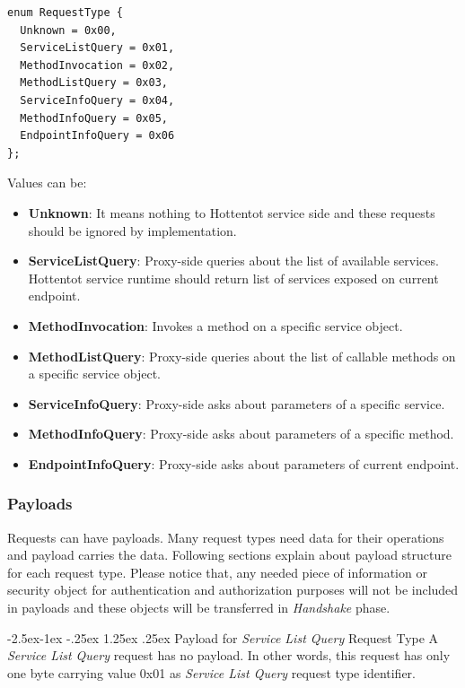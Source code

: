\documentclass[10pt,a4paper]{article}
\makeatletter
\renewcommand\paragraph{\@startsection{paragraph}{4}{\z@}%
            {-2.5ex\@plus -1ex \@minus -.25ex}%
            {1.25ex \@plus .25ex}%
            {\normalfont\normalsize\bfseries}}
\makeatother
\begin{document}
\begin{verbatim}
enum RequestType { 
  Unknown = 0x00, 
  ServiceListQuery = 0x01, 
  MethodInvocation = 0x02,
  MethodListQuery = 0x03,
  ServiceInfoQuery = 0x04,
  MethodInfoQuery = 0x05,
  EndpointInfoQuery = 0x06
};
\end{verbatim}

\noindent
Values can be:
\begin{itemize}
  \item \textbf{Unknown}: It means nothing to Hottentot service side and these requests should be ignored by implementation.
  \item \textbf{ServiceListQuery}: Proxy-side queries about the list of available services. Hottentot service runtime should return list of services exposed on current endpoint.
  \item \textbf{MethodInvocation}: Invokes a method on a specific service object.
  \item \textbf{MethodListQuery}: Proxy-side queries about the list of callable methods on a specific service object.
  \item \textbf{ServiceInfoQuery}: Proxy-side asks about parameters of a specific service.
  \item \textbf{MethodInfoQuery}: Proxy-side asks about parameters of a specific method.
  \item \textbf{EndpointInfoQuery}: Proxy-side asks about parameters of current endpoint.
\end{itemize}

\subsubsection{Payloads}
Requests can have payloads. Many request types need data for their operations and payload carries the data. Following sections explain about payload structure for each request type. Please notice that, any needed piece of information or security object for authentication and authorization purposes will not be included in payloads and these objects will be transferred in \textit{Handshake} phase.

\paragraph{Payload for \textit{Service List Query} Request Type}
A \textit{Service List Query} request has no payload. In other words, this request has only one byte carrying value 0x01 as \textit{Service List Query} request type identifier.
\end{document}
